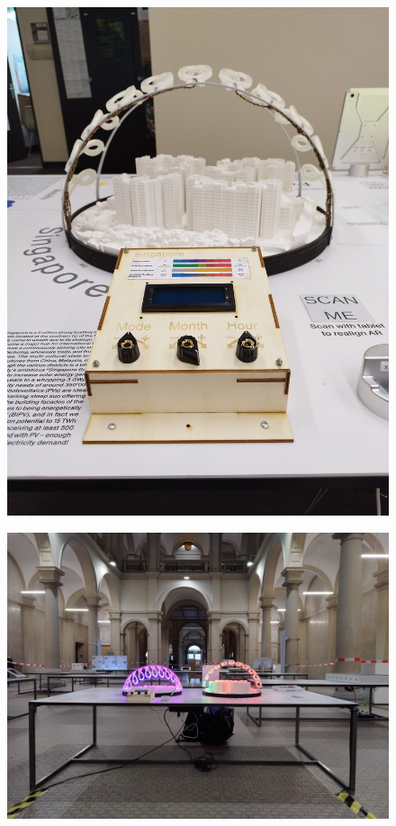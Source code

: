 \documentclass[a4paper,9pt]{article}
\begin{document}
\begin{landscape}
\begin{minipage}{0.48\linewidth}
\begin{figure}[H]
        \includegraphics[width=\linewidth]{Images/n2.jpg}
        \label{fin2}
    \end{figure}
\end{minipage}
\end{landscape}
\begin{minipage}{0.48\linewidth}
         \begin{figure}[H]
        \centering
        \includegraphics[width=\linewidth]{Images/1.jpg}
        \label{hg}
    \end{figure}
    \end{minipage}
\end{document}

